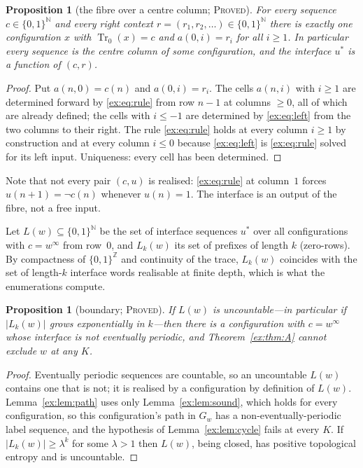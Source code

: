 \documentclass[11pt]{article}
\newtheorem{proposition}[theorem]{Proposition}
\theoremstyle{definition}
\theoremstyle{remark}
\newcommand{\Tr}{\operatorname{Tr}}
\newcommand{\N}{\mathbb{N}}
\newcommand{\Z}{\mathbb{Z}}
\newcommand{\PROVED}{\textsc{Proved}}
\begin{document}
\begin{proposition}[the fibre over a centre column; \PROVED]\label{ex:prop:surj}
For every sequence $c\in\{0,1\}^{\N}$ and every right context $r=(r_1,r_2,\dots)\in\{0,1\}^{\N}$ there is exactly one configuration $x$ with $\Tr_0(x)=c$ and $a(0,i)=r_i$ for all $i\ge1$. In particular every sequence is the centre column of some configuration, and the interface $u^*$ is a function of $(c,r)$.
\end{proposition}
\begin{proof}
Put $a(n,0)=c(n)$ and $a(0,i)=r_i$. The cells $a(n,i)$ with $i\ge1$ are determined forward by \eqref{ex:eq:rule} from row $n-1$ at columns $\ge0$, all of which are already defined; the cells with $i\le-1$ are determined by \eqref{ex:eq:left} from the two columns to their right. The rule \eqref{ex:eq:rule} holds at every column $i\ge1$ by construction and at every column $i\le0$ because \eqref{ex:eq:left} is \eqref{ex:eq:rule} solved for its left input. Uniqueness: every cell has been determined.
\end{proof}

Note that not every pair $(c,u)$ is realised: \eqref{ex:eq:rule} at column~$1$ forces $u(n+1)=\neg c(n)$ whenever $u(n)=1$. The interface is an output of the fibre, not a free input.

Let $L(w)\subseteq\{0,1\}^{\N}$ be the set of interface sequences $u^*$ over all configurations with $c=w^\infty$ from row~$0$, and $L_k(w)$ its set of prefixes of length $k$ (zero-rows). By compactness of $\{0,1\}^{\Z}$ and continuity of the trace, $L_k(w)$ coincides with the set of length-$k$ interface words realisable at finite depth, which is what the enumerations compute.

\begin{proposition}[boundary; \PROVED]\label{ex:prop:boundary}
If $L(w)$ is uncountable---in particular if $|L_k(w)|$ grows exponentially in $k$---then there is a configuration with $c=w^\infty$ whose interface is not eventually periodic, and Theorem~\ref{ex:thm:A} cannot exclude $w$ at any $K$.
\end{proposition}
\begin{proof}
Eventually periodic sequences are countable, so an uncountable $L(w)$ contains one that is not; it is realised by a configuration by definition of $L(w)$. Lemma~\ref{ex:lem:path} uses only Lemma~\ref{ex:lem:sound}, which holds for every configuration, so this configuration's path in $G_w$ has a non-eventually-periodic label sequence, and the hypothesis of Lemma~\ref{ex:lem:cycle} fails at every $K$. If $|L_k(w)|\ge\lambda^k$ for some $\lambda>1$ then $L(w)$, being closed, has positive topological entropy and is uncountable.
\end{proof}
\end{document}
